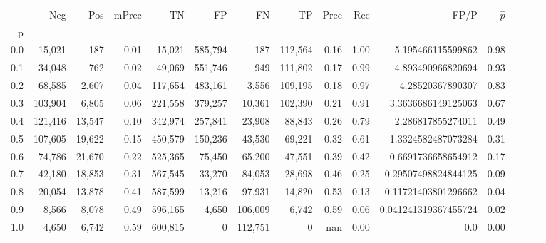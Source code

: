 \begin{tabular}{rrrrrrrrrrrrrrr}
\toprule
{} &      Neg &     Pos & mPrec &       TN &       FP &       FN &       TP &  Prec &   Rec &                  FP/P & $\hat{p}$ \\
p   &          &         &       &          &          &          &          &       &       &                       &           \\
\midrule
0.0 &   15,021 &     187 &  0.01 &   15,021 &  585,794 &      187 &  112,564 &  0.16 &  1.00 &     5.195466115599862 &      0.98 \\
0.1 &   34,048 &     762 &  0.02 &   49,069 &  551,746 &      949 &  111,802 &  0.17 &  0.99 &     4.893490966820694 &      0.93 \\
0.2 &   68,585 &   2,607 &  0.04 &  117,654 &  483,161 &    3,556 &  109,195 &  0.18 &  0.97 &      4.28520367890307 &      0.83 \\
0.3 &  103,904 &   6,805 &  0.06 &  221,558 &  379,257 &   10,361 &  102,390 &  0.21 &  0.91 &    3.3636686149125063 &      0.67 \\
0.4 &  121,416 &  13,547 &  0.10 &  342,974 &  257,841 &   23,908 &   88,843 &  0.26 &  0.79 &     2.286817855274011 &      0.49 \\
0.5 &  107,605 &  19,622 &  0.15 &  450,579 &  150,236 &   43,530 &   69,221 &  0.32 &  0.61 &    1.3324582487073284 &      0.31 \\
0.6 &   74,786 &  21,670 &  0.22 &  525,365 &   75,450 &   65,200 &   47,551 &  0.39 &  0.42 &    0.6691736658654912 &      0.17 \\
0.7 &   42,180 &  18,853 &  0.31 &  567,545 &   33,270 &   84,053 &   28,698 &  0.46 &  0.25 &   0.29507498824844125 &      0.09 \\
0.8 &   20,054 &  13,878 &  0.41 &  587,599 &   13,216 &   97,931 &   14,820 &  0.53 &  0.13 &   0.11721403801296662 &      0.04 \\
0.9 &    8,566 &   8,078 &  0.49 &  596,165 &    4,650 &  106,009 &    6,742 &  0.59 &  0.06 &  0.041241319367455724 &      0.02 \\
1.0 &    4,650 &   6,742 &  0.59 &  600,815 &        0 &  112,751 &        0 &   nan &  0.00 &                   0.0 &      0.00 \\
\bottomrule
\end{tabular}

